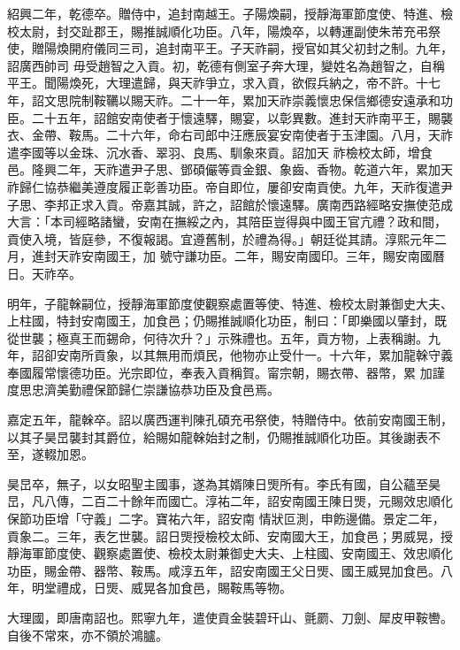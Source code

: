 \begin{pinyinscope}
 紹興二年，乾德卒。贈侍中，追封南越王。子陽煥嗣，授靜海軍節度使、特進、檢校太尉，封交趾郡王，賜推誠順化功臣。八年，陽煥卒，以轉運副使朱芾充弔祭使，贈陽煥開府儀同三司，追封南平王。子天祚嗣，授官如其父初封之制。九年，詔廣西帥司
 毋受趙智之入貢。初，乾德有側室子奔大理，變姓名為趙智之，自稱平王。聞陽煥死，大理遣歸，與天祚爭立，求入貢，欲假兵納之，帝不許。十七年，詔文思院制鞍韉以賜天祚。二十一年，累加天祚崇義懷忠保信鄉德安遠承和功臣。二十五年，詔館安南使者于懷遠驛，賜宴，以彰異數。進封天祚南平王，賜襲衣、金帶、鞍馬。二十六年，命右司郎中汪應辰宴安南使者于玉津園。八月，天祚遣李國等以金珠、沉水香、翠羽、良馬、馴象來貢。詔加天
 祚檢校太師，增食邑。隆興二年，天祚遣尹子思、鄧碩儼等貢金銀、象齒、香物。乾道六年，累加天祚歸仁協恭繼美遵度履正彰善功臣。帝自即位，屢卻安南貢使。九年，天祚復遣尹子思、李邦正求入貢。帝嘉其誠，許之，詔館於懷遠驛。廣南西路經略安撫使范成大言：「本司經略諸蠻，安南在撫綏之內，其陪臣豈得與中國王官亢禮？政和間，貢使入境，皆庭參，不復報謁。宜遵舊制，於禮為得。」朝廷從其請。淳熙元年二月，進封天祚安南國王，加
 號守謙功臣。二年，賜安南國印。三年，賜安南國曆日。天祚卒。



 明年，子龍榦嗣位，授靜海軍節度使觀察處置等使、特進、檢校太尉兼御史大夫、上柱國，特封安南國王，加食邑；仍賜推誠順化功臣，制曰：「即樂國以肇封，既從世襲；極真王而錫命，何待次升？」示殊禮也。五年，貢方物，上表稱謝。九年，詔卻安南所貢象，以其無用而煩民，他物亦止受什一。十六年，累加龍榦守義奉國履常懷德功臣。光宗即位，奉表入貢稱賀。甯宗朝，賜衣帶、器幣，累
 加謹度思忠濟美勤禮保節歸仁崇謙協恭功臣及食邑焉。



 嘉定五年，龍榦卒。詔以廣西運判陳孔碩充弔祭使，特贈侍中。依前安南國王制，以其子昊旵襲封其爵位，給賜如龍榦始封之制，仍賜推誠順化功臣。其後謝表不至，遂輟加恩。



 昊旵卒，無子，以女昭聖主國事，遂為其婿陳日煚所有。李氏有國，自公蘊至昊旵，凡八傳，二百二十餘年而國亡。淳祐二年，詔安南國王陳日煚，元賜效忠順化保節功臣增「守義」二字。寶祐六年，詔安南
 情狀叵測，申飭邊備。景定二年，貢象二。三年，表乞世襲。詔日煚授檢校太師、安南國大王，加食邑；男威晃，授靜海軍節度使、觀察處置使、檢校太尉兼御史大夫、上柱國、安南國王、效忠順化功臣，賜金帶、器幣、鞍馬。咸淳五年，詔安南國王父日煚、國王威晃加食邑。八年，明堂禮成，日煚、威晃各加食邑，賜鞍馬等物。



 大理國，即唐南詔也。熙寧九年，遣使貢金裝碧玕山、氈罽、刀劍、犀皮甲鞍轡。自後不常來，亦不領於鴻臚。




\end{pinyinscope}
